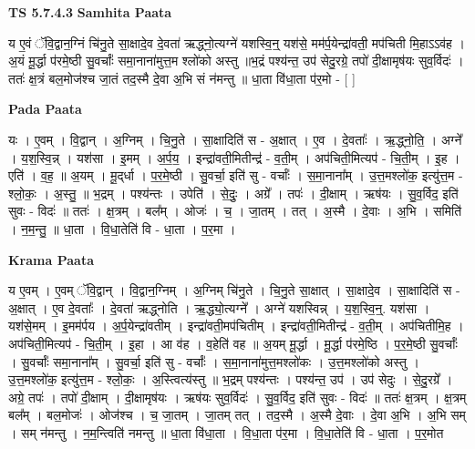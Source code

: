 \documentclass[17pt]{extarticle}
\begin{document}
\textbf{TS 5.7.4.3 } \newline
\textbf{Samhita Paata} \newline

य ए॒वं ॅवि॒द्वान॒ग्निं चि॑नु॒ते सा॒क्षादे॒व दे॒वता॑ ऋद्ध्नो॒त्यग्ने॑ यशस्वि॒न्॒ यश॑से॒ मम॑र्प॒येन्द्रा॑वती॒ मप॑चिती मि॒हाऽऽव॑ह । अ॒यं मू॒र्द्धा प॑रमे॒ष्ठी सु॒वर्चाः᳚ समा॒नाना॑मुत्त॒म श्लो॑को अस्तु ॥भ॒द्रं पश्य॑न्त॒ उप॑ सेदु॒रग्रे॒ तपो॑ दी॒क्षामृष॑यः सुव॒र्विदः॑ । ततः॑ क्ष॒त्रं बल॒मोज॑श्च जा॒तं तद॒स्मै दे॒वा अ॒भि सं न॑मन्तु ॥ धा॒ता वि॑धा॒ता प॑र॒मो - [  ] \newline

\textbf{Pada Paata} \newline

यः । ए॒वम् । वि॒द्वान् । अ॒ग्निम् । चि॒नु॒ते । सा॒क्षादिति॑ स - अ॒क्षात् । ए॒व । दे॒वताः᳚ । ऋ॒द्ध्नो॒ति॒ । अग्ने᳚ । य॒श॒स्वि॒न्न् । यश॑सा । इ॒मम् । अ॒र्प॒य॒ । इन्द्रा॑वती॒मितीन्द्र॑ - व॒ती॒म् । अप॑चिती॒मित्यप॑ - चि॒ती॒म् । इ॒ह । एति॑ । व॒ह॒ ॥ अ॒यम् । मू॒द्‌र्धा । प॒र॒मे॒ष्ठी । सु॒वर्चा॒ इति॑ सु - वर्चाः᳚ । स॒मा॒नाना᳚म् । उ॒त्त॒मश्लो॑क॒ इत्यु॑त्त॒म - श्लो॒कः॒ । अ॒स्तु॒ ॥ भ॒द्रम् । पश्य॑न्तः । उपेति॑ । से॒दुः॒ । अग्रे᳚ । तपः॑ । दी॒क्षाम् । ऋष॑यः । सु॒व॒र्विद॒ इति॑ सुवः - विदः॑ ॥ ततः॑ । क्ष॒त्रम् । बल᳚म् । ओजः॑ । च॒ । जा॒तम् । तत् । अ॒स्मै । दे॒वाः । अ॒भि । समिति॑ । न॒म॒न्तु॒ ॥ धा॒ता । वि॒धा॒तेति॑ वि - धा॒ता । प॒र॒मा ।  \newline


\textbf{Krama Paata} \newline

य ए॒वम् । ए॒वम् ॅवि॒द्वान् । वि॒द्वान॒ग्निम् । अ॒ग्निम् चि॑नु॒ते । चि॒नु॒ते सा॒क्षात् । सा॒क्षादे॒व । सा॒क्षादिति॑ स - अ॒क्षात् । ए॒व दे॒वताः᳚ । दे॒वता॑ ऋद्ध्नोति । ऋ॒द्ध्यो॒त्यग्ने᳚ । अग्ने॑ यशस्विन्न् । य॒श॒स्वि॒न्॒. यश॑सा । यश॑से॒मम् । इ॒मम॑र्पय । अ॒र्प॒येन्द्रा॑वतीम् । इन्द्रा॑वती॒मप॑चितीम् । इन्द्रा॑वती॒मितीन्द्र॑ - व॒ती॒म् । अप॑चितीमि॒ह । अप॑चिती॒मित्यप॑ - चि॒ती॒म् । इ॒हा । आ व॑ह । व॒हेति॑ वह ॥ अ॒यम् मू॒र्द्धा । मू॒र्द्धा प॑रमे॒ष्ठि । प॒र॒मे॒ष्ठी सु॒वर्चाः᳚ । सु॒वर्चाः᳚ समा॒नाना᳚म् । सु॒वर्चा॒ इति॑ सु - वर्चाः᳚ । स॒मा॒नाना॑मुत्त॒मश्लो॑कः । उ॒त्त॒मश्लो॑को अस्तु । उ॒त्त॒मश्लो॑क॒ इत्यु॑त्त॒म - श्लो॒कः॒ । अ॒स्त्वित्य॑स्तु ॥ भ॒द्रम् पश्य॑न्तः । पश्य॑न्त॒ उप॑ । उप॑ सेदुः । से॒दु॒रग्रे᳚ । अग्रे॒ तपः॑ । तपो॑ दी॒क्षाम् । दी॒क्षामृष॑यः । ऋष॑यः सुव॒र्विदः॑ । सु॒व॒र्विद॒ इति॑ सुवः - विदः॑ ॥ ततः॑ क्ष॒त्रम् । क्ष॒त्रम् बल᳚म् । बल॒मोजः॑ । ओज॑श्च । च॒ जा॒तम् । जा॒तम् तत् । तद॒स्मै । अ॒स्मै दे॒वाः । दे॒वा अ॒भि । अ॒भि सम् । सम् न॑मन्तु । न॒म॒न्त्विति॑ नमन्तु ॥ धा॒ता वि॑धा॒ता । वि॒धा॒ता प॑र॒मा । वि॒धा॒तेति॑ वि - धा॒ता । प॒र॒मोत \newline
\end{document}
